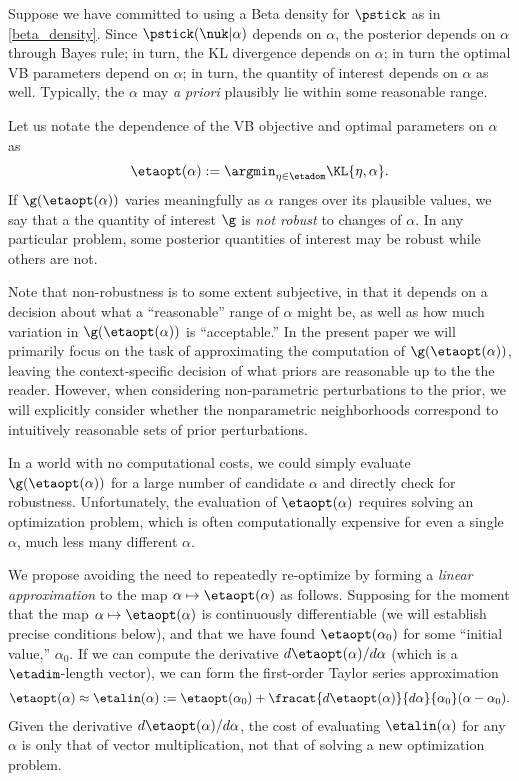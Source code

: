 Suppose we have committed to using a Beta density for $\pstick$ as in
\eqref{beta_density}. Since $\pstick(\nuk \vert \alpha)$ depends on $\alpha$,
the posterior depends on $\alpha$ through Bayes rule; in turn, the KL divergence
depends on $\alpha$; in turn the optimal VB parameters depend on $\alpha$; in
turn, the quantity of interest depends on $\alpha$ as well. Typically, the
$\alpha$ may {\em a priori} plausibly lie within some reasonable range.

Let us notate the dependence of the VB objective and optimal parameters on
$\alpha$ as
%
\begin{align*}
%
\etaopt(\alpha) := \argmin_{\eta \in \etadom} \KL{\eta, \alpha}.
%
\end{align*}
%
If $\g(\etaopt(\alpha))$ varies meaningfully as $\alpha$ ranges over its
plausible values, we say that a the quantity of interest $\g$ is {\em not
robust} to changes of $\alpha$.  In any particular problem, some posterior
quantities of interest may be robust while others are not.

Note that non-robustness is to some extent subjective, in that it depends on a
decision about what a ``reasonable'' range of $\alpha$ might be, as well as how
much variation in $\g(\etaopt(\alpha))$ is ``acceptable.''  In the present paper
we will primarily focus on the task of approximating the computation of
$\g(\etaopt(\alpha))$, leaving the context-specific decision of what priors are
reasonable up to the the reader.  However, when considering non-parametric
perturbations to the prior, we will explicitly consider whether the
nonparametric neighborhoods correspond to intuitively reasonable sets of prior
perturbations.

In a world with no computational costs, we could simply evaluate
$\g(\etaopt(\alpha))$ for a large number of candidate $\alpha$ and directly
check for robustness.  Unfortunately, the evaluation of $\etaopt(\alpha)$
requires solving an optimization problem, which is often computationally
expensive for even a single $\alpha$, much less many different $\alpha$.

We propose avoiding the need to repeatedly re-optimize by forming a {\em linear
approximation} to the map $\alpha \mapsto \etaopt(\alpha)$ as follows. Supposing
for the moment that the map $\alpha \mapsto \etaopt(\alpha)$ is continuously
differentiable (we will establish precise conditions below), and that we have
found $\etaopt(\alpha_0)$ for some ``initial value,'' $\alpha_0$.  If we can
compute the derivative $d \etaopt(\alpha) / d\alpha$ (which is a
$\etadim$-length vector), we can form the first-order Taylor series
approximation
%
\begin{align*}
%
\etaopt(\alpha) \approx \etalin(\alpha) :={}
    \etaopt(\alpha_0) +
    \fracat{d \etaopt(\alpha)}{d\alpha}{\alpha_0} (\alpha - \alpha_0).
%
\end{align*}
%
Given the derivative $d \etaopt(\alpha) / d\alpha$, the cost of evaluating
$\etalin(\alpha)$ for any $\alpha$ is only that of vector multiplication, not
that of solving a new optimization problem.


